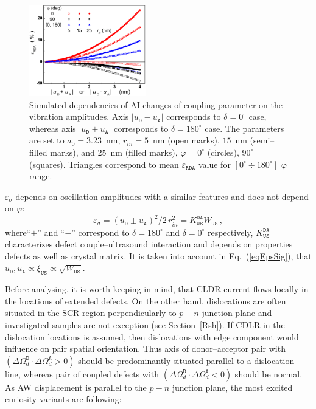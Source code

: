 \documentclass[aip,jap, amsmath,amssymb,reprint]{revtex4-1}
\begin{document}
\begin{figure}
\includegraphics[width=0.45\textwidth]{olikhFig5}%
\caption{\label{fig_Erda}
Simulated dependencies of AI changes of coupling parameter on the vibration amplitudes.
Axis $|u_\mathtt{D}-u_\mathtt{A}|$ corresponds to $\delta=0^\circ$ case, whereas axis $|u_\mathtt{D}+u_\mathtt{A}|$ corresponds to $\delta=180^\circ$ case.
The parameters are set to $a_0=3.23$~nm,
$r_{in}=5$~nm (open marks), $15$~nm (semi--filled marks), and $25$~nm (filled marks),
$\varphi=0^\circ$ (circles), $90^\circ$ (squares).
Triangles correspond to mean $\varepsilon_{\mathtt{RDA}}$ value for $[0^\circ\div 180^\circ]$ $\varphi$ range.
}%
\end{figure}

$\varepsilon_{\sigma}$ depends on oscillation amplitudes with a similar features and
does not depend on $\varphi$:
\begin{equation}
\label{eqEpsSig}
\varepsilon_{\sigma}=(u_\mathtt{D}\pm u_\mathtt{A})^2/2\,r_{in}^2=K_\mathtt{US}^\mathtt{DA}W_{\mathtt{US}}\,,
\end{equation}
where``$+$'' and ``$-$'' correspond to $\delta=180^\circ$ and $\delta=0^\circ$ respectively,
$K_\mathtt{US}^\mathtt{DA}$ characterizes defect couple--ultrasound interaction and depends on properties defects as well as crystal matrix.
It is taken into account in Eq.~(\ref{eqEpsSig}), that $u_\mathtt{D},u_\mathtt{A}\propto \xi_\mathtt{US}\propto\sqrt{W_\mathtt{US}}$.

Before analysing, it is worth keeping in mind, that
CLDR current flows locally in the locations of extended defects.\cite{CDLR:JAP,CDLR:SSP}
On the other hand, dislocations are often situated in the SCR region perpendicularly to $p-n$ junction plane
and investigated samples are not exception (see Section~\ref{Rsh}).
If CDLR in the dislocation locations is assumed, then dislocations with edge component would influence on pair spatial orientation.
Thus axis of donor--acceptor pair with $(\Delta\Omega_d^\mathtt{D}\cdot\Delta\Omega_d^\mathtt{A}>0)$  should be predominantly situated parallel to a dislocation line,
whereas pair of coupled defects with $(\Delta\Omega_d^\mathtt{D}\cdot\Delta\Omega_d^\mathtt{A}<0)$ should be normal.
As AW displacement is parallel to the $p-n$ junction plane,
the most excited curiosity variants are following:
\end{document}
